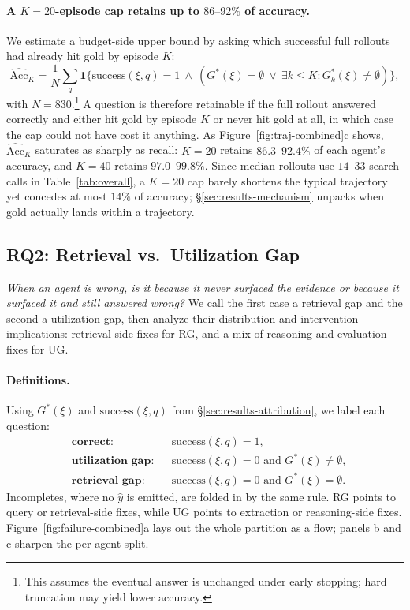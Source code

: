 \paragraph{A $K = 20$-episode cap retains up to $86\text{--}92\%$ of accuracy.} We estimate a budget-side upper bound by asking which successful full rollouts had already hit gold by episode $K$:
\[
\widehat{\mathrm{Acc}}_K =
\frac{1}{N}\sum_q
\mathbf{1}\{\mathrm{success}(\xi,q)=1 \ \wedge\  (G^*(\xi) = \emptyset \ \vee\ \exists k \le K: G^*_k(\xi) \neq \emptyset)\},
\]
with $N=830$.\footnote{This assumes the eventual answer is unchanged under early stopping; hard truncation may yield lower accuracy.} A question is therefore retainable if the full rollout answered correctly and either hit gold by episode $K$ or never hit gold at all, in which case the cap could not have cost it anything. As Figure~\ref{fig:traj-combined}c shows, $\widehat{\mathrm{Acc}}_K$ saturates as sharply as recall: $K = 20$ retains $86.3\text{--}92.4\%$ of each agent's accuracy, and $K = 40$ retains $97.0\text{--}99.8\%$. Since median rollouts use $14\text{--}33$ search calls in Table~\ref{tab:overall}, a $K = 20$ cap barely shortens the typical trajectory yet concedes at most $14\%$ of accuracy; §\ref{sec:results-mechanism} unpacks when gold actually lands within a trajectory.

\subsection{RQ2: Retrieval vs.\ Utilization Gap}
\label{sec:results-failure}
\label{sec:results-oracle}

\emph{When an agent is wrong, is it because it never surfaced the evidence or because it surfaced it and still answered wrong?} We call the first case a retrieval gap and the second a utilization gap, then analyze their distribution and intervention implications: retrieval-side fixes for RG, and a mix of reasoning and evaluation fixes for UG.

\paragraph{Definitions.} Using $G^*(\xi)$ and $\mathrm{success}(\xi, q)$ from §\ref{sec:results-attribution}, we label each question:
\begin{equation*}
\begin{aligned}
&\textbf{correct:} && \mathrm{success}(\xi, q) = 1, \\
&\textbf{utilization gap:} && \mathrm{success}(\xi, q) = 0 \text{ and } G^*(\xi) \neq \emptyset, \\
&\textbf{retrieval gap:} && \mathrm{success}(\xi, q) = 0 \text{ and } G^*(\xi) = \emptyset.
\end{aligned}
\end{equation*}
Incompletes, where no $\hat{y}$ is emitted, are folded in by the same rule. RG points to query or retrieval-side fixes, while UG points to extraction or reasoning-side fixes. Figure~\ref{fig:failure-combined}a lays out the whole partition as a flow; panels b and c sharpen the per-agent split.

